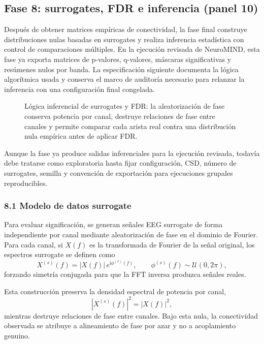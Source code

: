 \subsection{Fase 8: surrogates, FDR e inferencia (panel 10)}

Después de obtener matrices empíricas de conectividad, la fase final construye distribuciones nulas basadas en surrogates y realiza inferencia estadística con control de comparaciones múltiples. En la ejecución revisada de NeuroMIND, esta fase ya exporta matrices de p-valores, q-valores, máscaras significativas y resúmenes nulos por banda. La especificación siguiente documenta la lógica algorítmica usada y conserva el marco de auditoría necesario para relanzar la inferencia con una configuración final congelada.

\begin{fullwidth}
\begin{figure}[H]
\centering
\resizebox{0.92\fulltextwidth}{!}{\NSSurrogatesFDR}
\caption{Lógica inferencial de surrogates y FDR: la aleatorización de fase conserva potencia por canal, destruye relaciones de fase entre canales y permite comparar cada arista real contra una distribución nula empírica antes de aplicar FDR.}
\label{fig:generated-surrogates-fdr}
\end{figure}
\end{fullwidth}

\begin{pendiente}
Aunque la fase ya produce salidas inferenciales para la ejecución revisada, todavía debe tratarse como exploratoria hasta fijar configuración, CSD, número de surrogates, semilla y convención de exportación para ejecuciones grupales reproducibles.
\end{pendiente}

\subsubsection{8.1 Modelo de datos surrogate}
Para evaluar significación, se generan señales EEG surrogate de forma independiente por canal mediante aleatorización de fase en el dominio de Fourier. Para cada canal, si $X(f)$ es la transformada de Fourier de la señal original, los espectros surrogate se definen como
\[
X^{(s)}(f)=|X(f)|\,e^{\mathrm{i}\phi^{(s)}(f)},
\qquad
\phi^{(s)}(f)\sim\mathcal{U}(0,2\pi),
\]
forzando simetría conjugada para que la FFT inversa produzca señales reales.

Esta construcción preserva la densidad espectral de potencia por canal,
\[
\left|X^{(s)}(f)\right|^2=\left|X(f)\right|^2,
\]
mientras destruye relaciones de fase entre canales. Bajo esta nula, la conectividad observada se atribuye a alineamiento de fase por azar y no a acoplamiento genuino.

